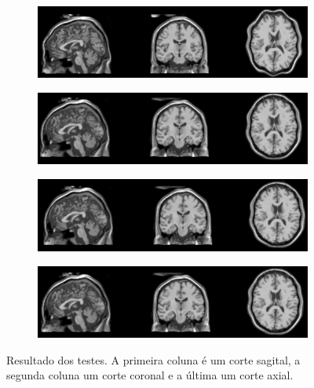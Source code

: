 \begin{figure}[H]
    \begin{minipage}[b]{0.45\linewidth}
      \centering
      \begin{subfigure}[t]{1\textwidth}
        \includegraphics[width=\textwidth]{figuras/result001.png}
        \label{fig:576}
      \end{subfigure}
      \begin{subfigure}[t]{1\textwidth}
        \includegraphics[width=\textwidth]{figuras/result002.png}
        \label{fig:2016}
      \end{subfigure}
    \end{minipage}
    \hspace{0.5cm}
    \begin{minipage}[b]{0.45\linewidth}
      \centering
      \begin{subfigure}[t]{1\textwidth}
        \includegraphics[width=\textwidth]{figuras/result003.png}
        \label{fig:4864}
      \end{subfigure}
      \begin{subfigure}[t]{1\textwidth}
        \includegraphics[width=\textwidth]{figuras/result004.png}
        \label{fig:7942}
      \end{subfigure}
    \end{minipage}
    \caption{Resultado dos testes. A primeira coluna é um corte sagital,
             a segunda coluna um corte coronal e a última um corte axial.}
    \label{fig:resultsAll}
\end{figure}

